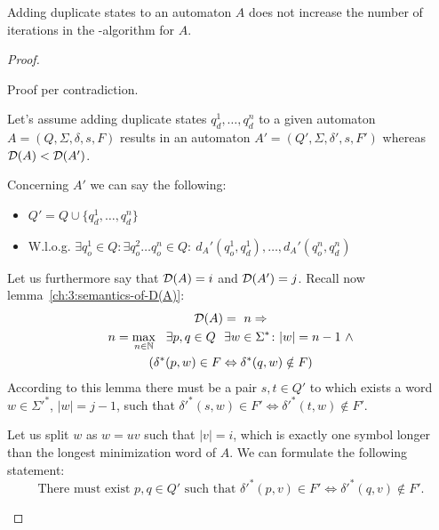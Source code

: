 \begin{theorem}[]
	Adding duplicate states to an automaton $A$ does not increase the number of iterations in the \MinMark-algorithm for $A$.
\end{theorem}

\begin{proof}
	\begin{description}
		\item
		
		Proof per contradiction.
		
		Let's assume adding duplicate states $q_d^1, \ldots, q_d^n$ to a given automaton $A = (Q, \Sigma, \delta, s, F)$ results in an automaton $A' = (Q', \Sigma, \delta', s, F')$ whereas $\mathcal{D}(A) < \mathcal{D}(A')$.
		
		Concerning $A'$ we can say the following:
		\begin{itemize}
			\item $Q' = Q \cup \{ q_d^1, \ldots, q_d^n \}$
			\item W.l.o.g. $\exists q_o^1 \in Q \colon \exists q_o^2 \ldots q_o^n \in Q \colon\ d_A'(q_o^1, q_d^1), \ldots, d_A'(q_o^n, q_d^n)$
		\end{itemize}
		Let us furthermore say that $\mathcal{D}(A) = i$ and $\mathcal{D}(A') = j$. Recall now lemma~\ref{ch:3:semantics-of-D(A)}:
		\begin{multline*}
		\mathcal{D}(A) =\ n \Rightarrow \\
		n = \max_{n \in \mathbb{N}}\ \ \exists p, q \in Q\ \ \exists w \in \Sigma^* \colon |w| = n - 1\ \land \\
		(\delta^*(p,w) \in F \Leftrightarrow \delta^*(q,w) \notin F)
		\end{multline*}
		According to this lemma there must be a pair $s, t \in Q'$ to which exists a word $w \in \Sigma'^*$, $|w| = j - 1$, such that $\delta'^*(s,w) \in F' \Leftrightarrow \delta'^*(t,w) \notin F'$.
		
		Let us split $w$ as $w = uv$ such that $|v| = i$, which is exactly one symbol longer than the longest minimization word of $A$. We can formulate the following statement:
		\begin{equation}
		\text{There must exist }p, q \in Q'\text{ such that }\delta'^*(p,v) \in F' \Leftrightarrow \delta'^*(q,v) \notin F'.
		\end{equation}
		

\end{description}
\end{proof}
